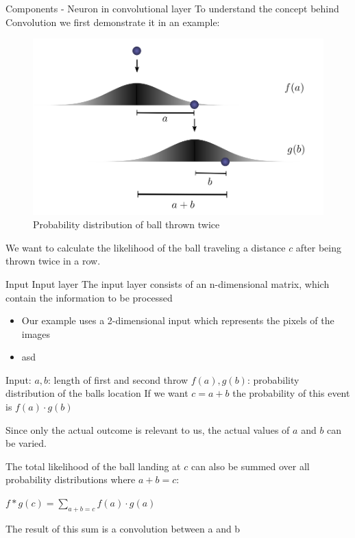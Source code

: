 \documentclass[12pt]{beamer}
\begin{document}
\begin{frame}{Components - Neuron in convolutional layer}
To understand the concept behind Convolution we first demonstrate it in an example:
\begin{figure}
\centering
\includegraphics[width = 0.4\linewidth]{images/convprob.png}
\caption{Probability distribution of ball thrown twice}
\label{fig:principle}
\end{figure}
We want to calculate the likelihood of the ball traveling a distance $c$ after being thrown twice in a row. \newline


\end{frame}
\begin{frame}{Input}
\huge
Input layer
\newline
\normalsize
The input layer consists of an n-dimensional matrix, which contain the information to be processed

\begin{itemize}
\item Our example uses a 2-dimensional input which represents the pixels of the images
\item asd
\end{itemize}



\end{frame}


\begin{frame}
Input: \newline
$a, b$: length of first and second throw
$f(a), g(b)$: probability distribution of the balls location
If we want $c = a + b$ the probability of this event is $f(a) \cdot g(b)$

Since only the actual outcome is relevant to us, the actual values of $a$ and $b$ can be varied.

The total likelihood of the ball landing at $c$ can also be summed over all probability distributions where $a+b=c$:

$f*g(c) = \sum_{a+b=c} {f(a) \cdot g(a)} $

The result of this sum is a convolution between a and b
\end{frame}
\end{document}
